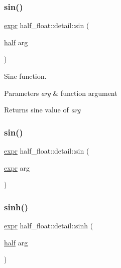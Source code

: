 \subsubsection{\texorpdfstring{sin()}{sin()}\hspace{0.1cm}{\footnotesize\ttfamily [1/2]}}
{\footnotesize\ttfamily \hyperlink{structhalf__float_1_1detail_1_1expr}{expr} half\+\_\+float\+::detail\+::sin (\begin{DoxyParamCaption}\item[{\hyperlink{classhalf__float_1_1half}{half}}]{arg }\end{DoxyParamCaption})\hspace{0.3cm}{\ttfamily [inline]}}

Sine function. 
\begin{DoxyParams}{Parameters}
{\em arg} & function argument \\
\hline
\end{DoxyParams}
\begin{DoxyReturn}{Returns}
sine value of {\itshape arg} 
\end{DoxyReturn}
\mbox{\label{namespacehalf__float_1_1detail_a5ae15ff362de65ac7784397ea32e4d3d}} 
\subsubsection{\texorpdfstring{sin()}{sin()}\hspace{0.1cm}{\footnotesize\ttfamily [2/2]}}
{\footnotesize\ttfamily \hyperlink{structhalf__float_1_1detail_1_1expr}{expr} half\+\_\+float\+::detail\+::sin (\begin{DoxyParamCaption}\item[{\hyperlink{structhalf__float_1_1detail_1_1expr}{expr}}]{arg }\end{DoxyParamCaption})\hspace{0.3cm}{\ttfamily [inline]}}

\mbox{\label{namespacehalf__float_1_1detail_aa56d689bec38bfbf9d86192209e705f7}} 
\subsubsection{\texorpdfstring{sinh()}{sinh()}\hspace{0.1cm}{\footnotesize\ttfamily [1/2]}}
{\footnotesize\ttfamily \hyperlink{structhalf__float_1_1detail_1_1expr}{expr} half\+\_\+float\+::detail\+::sinh (\begin{DoxyParamCaption}\item[{\hyperlink{classhalf__float_1_1half}{half}}]{arg }\end{DoxyParamCaption})\hspace{0.3cm}{\ttfamily [inline]}}

